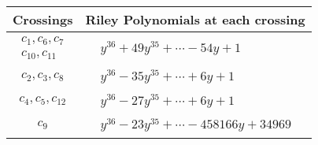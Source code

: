 \documentclass[1p]{elsarticle_modified}
\theoremstyle{definition}
\begin{document}
\begin{tabular}{m{50pt}|m{274pt}}
Crossings & \hspace{64pt}Riley Polynomials at each crossing \\
\hline $$\begin{aligned}c_{1},c_{6},c_{7}\\c_{10},c_{11}\end{aligned}$$&$\begin{aligned}
&y^{36}+49 y^{35}+\cdots-54 y+1
\end{aligned}$\\
\hline $$\begin{aligned}c_{2},c_{3},c_{8}\end{aligned}$$&$\begin{aligned}
&y^{36}-35 y^{35}+\cdots+6 y+1
\end{aligned}$\\
\hline $$\begin{aligned}c_{4},c_{5},c_{12}\end{aligned}$$&$\begin{aligned}
&y^{36}-27 y^{35}+\cdots+6 y+1
\end{aligned}$\\
\hline $$\begin{aligned}c_{9}\end{aligned}$$&$\begin{aligned}
&y^{36}-23 y^{35}+\cdots-458166 y+34969
\end{aligned}$\\
\hline
\end{tabular}
\vskip 2pc
\end{document}
